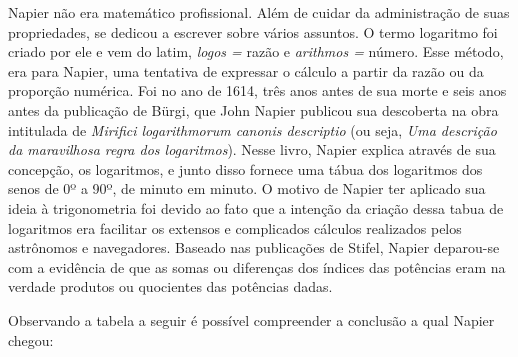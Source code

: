 \documentclass[12pt]{article}
\begin{document}
\begin{enumerate}[label*={\fontsize{14pt}{14pt}\selectfont \textbf{\arabic*.}}]
\begin{justify}
\tab Napier não era matemático profissional. Além de cuidar da administração de suas propriedades, se dedicou a escrever sobre vários assuntos. O termo logaritmo foi criado por ele e vem do latim, \textit{logos = }razão e \textit{arithmos =} número.\textit{ }Esse método, era para Napier, uma tentativa de expressar o cálculo a partir da razão ou da proporção numérica. Foi no ano de 1614, três anos antes de sua morte e seis anos antes da publicação de Bürgi, que John Napier publicou sua descoberta na obra intitulada de \textit{Mirifici logarithmorum canonis descriptio} (ou seja, \textit{Uma descrição da maravilhosa regra dos logaritmos}). Nesse livro, Napier explica através de sua concepção, os logaritmos, e junto disso fornece uma tábua dos logaritmos dos senos de 0º a 90º, de minuto em minuto. O motivo de Napier ter aplicado sua ideia à trigonometria foi devido ao fato que a intenção da criação dessa tabua de logaritmos era facilitar os extensos e complicados cálculos realizados pelos astrônomos e navegadores. Baseado nas publicações de Stifel, Napier deparou-se com a evidência de que as somas ou diferenças dos índices das potências eram na verdade produtos ou quocientes das potências dadas.
\end{justify}\par

\begin{justify}
\tab Observando a tabela a seguir é possível compreender a conclusão a qual Napier chegou: 
\end{justify}\par


\vspace{\baselineskip}





\end{enumerate}
\end{document}
